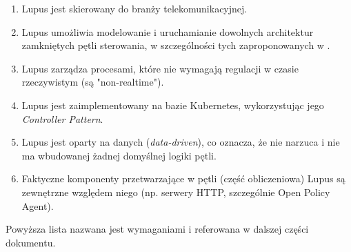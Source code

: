 \begin{enumerate}
    \item \label{req:1} Lupus jest skierowany do branży telekomunikacyjnej.
    \item \label{req:2} Lupus umożliwia modelowanie i uruchamianie dowolnych architektur zamkniętych pętli sterowania, w szczególności tych zaproponowanych w \cite{enioverview}.
    \item \label{req:3} Lupus zarządza procesami, które nie wymagają regulacji w czasie rzeczywistym (są "non-realtime").
    \item \label{req:4} Lupus jest zaimplementowany na bazie Kubernetes, wykorzystując jego \textit{Controller Pattern}.
    \item \label{req:5} Lupus jest oparty na danych (\textit{data-driven}), co oznacza, że nie narzuca i nie ma wbudowanej żadnej domyślnej logiki pętli.
    \item \label{req:6} Faktyczne komponenty przetwarzające w pętli (część obliczeniowa) Lupus są zewnętrzne względem niego (np. serwery HTTP, szczególnie Open Policy Agent).
\end{enumerate}

Powyższa lista nazwana jest wymaganiami i referowana w dalszej części dokumentu. 
